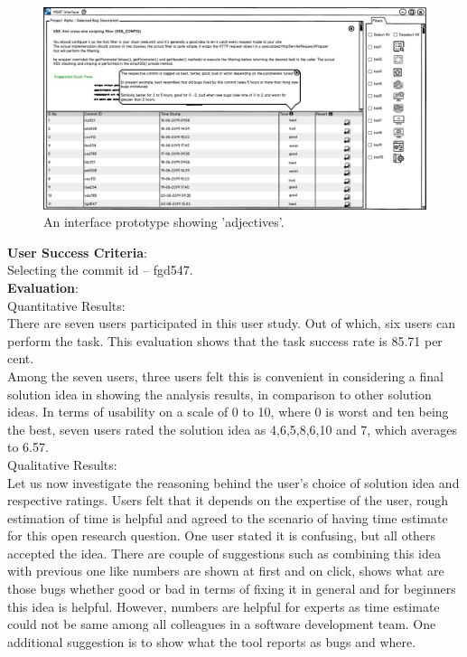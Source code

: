 \begin{figure}[hbt!]
	\centering
	\includegraphics[width=\linewidth]{figures/solution_ideas_snaps/S23_adjectives}
	\caption{An interface prototype showing 'adjectives'.}
	\label{fig:S23_adjectives}
\end{figure}

\textbf{User Success Criteria}: \\

Selecting the commit id – fgd547. \\

\textbf{Evaluation}: \\

Quantitative Results: \\

There are seven users participated in this user study. Out of which, six users can perform the task. This evaluation shows that the task success rate is 85.71 per cent. \\

Among the seven users, three users felt this is convenient in considering a final solution idea in showing the analysis results, in comparison to other solution ideas. In terms of usability on a scale of 0 to 10, where 0 is worst and ten being the best, seven users rated the solution idea as 4,6,5,8,6,10 and 7, which averages to 6.57. \\

Qualitative Results: \\

Let us now investigate the reasoning behind the user’s choice of solution idea and respective ratings. Users felt that it depends on the expertise of the user, rough estimation of time is helpful and agreed to the scenario of having time estimate for this open research question. One user stated it is confusing, but all others accepted the idea. There are couple of suggestions such as combining this idea with previous one like numbers are shown at first and on click, shows what are those bugs whether good or bad in terms of fixing it in general and for beginners this idea is helpful. However, numbers are helpful for experts as time estimate could not be same among all colleagues in a software development team. One additional suggestion is to show what the tool reports as bugs and where. \\

